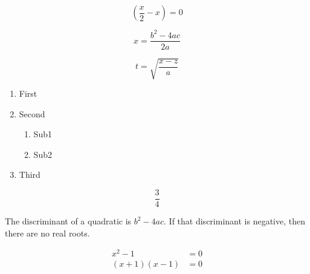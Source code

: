 \documentclass{article}
\begin{document}
$$\left( \frac{x}{2} - x \right ) = 0$$


$$x = \frac{b^2-4ac}{2a}$$


$$t = \sqrt{\frac{x-z}{a}}$$




\begin{enumerate}
\item First
\item Second
		\begin{enumerate}
		\item Sub1
		\item Sub2
		\end{enumerate}
\item Third
\end{enumerate}


$$\frac{3}{4}$$


The discriminant of a quadratic is $b^2 - 4ac$.  If that discriminant
is negative, then there are no real roots.


\begin{align*}
x^2-1 &= 0 \\
(x+1)(x-1) &=0
\end{align*}
\end{document}
